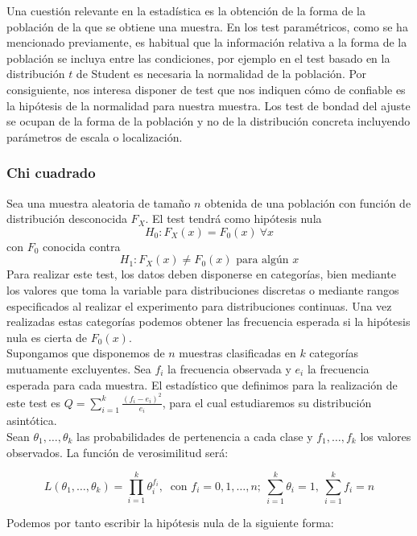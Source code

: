 	Una cuestión relevante en la estadística es la obtención 
de la forma de la población de la que se obtiene una muestra. 
En los test paramétricos, como se ha mencionado previamente, 
es habitual que la información relativa a la forma de la 
población se incluya entre las condiciones, por ejemplo en el 
test basado en la distribución $t$ de Student es necesaria la 
normalidad de la población. Por consiguiente, nos interesa 
disponer de test que nos indiquen cómo de confiable es la 
hipótesis de la normalidad para nuestra muestra. Los test de 
bondad del ajuste se ocupan de la forma de la población y no 
de la distribución concreta incluyendo parámetros de escala o 
localización.
	
\subsubsection{Chi cuadrado}

	Sea una muestra aleatoria de tamaño $n$ obtenida de una 
población con función de distribución desconocida $F_X$. El 
test tendrá como hipótesis nula
		\[ H_0: F_X(x) = F_0(x) \ \forall x \]
	con $F_0$ conocida contra
		\[ H_1: F_X(x) \neq F_0(x) \text{ para algún }  x \]
	Para realizar este test, los datos deben disponerse en
categorías, bien mediante los valores que toma la variable 
para distribuciones discretas o mediante rangos especificados 
al realizar el experimento para distribuciones continuas. Una 
vez realizadas estas categorías podemos obtener las 
frecuencia esperada si la hipótesis nula es cierta de 
$F_0(x)$.\\
	
	Supongamos que disponemos de $n$ muestras clasificadas en 
$k$ categorías mutuamente excluyentes. Sea $f_i$ la 
frecuencia observada y $e_i$ la frecuencia esperada para cada 
muestra. El estadístico que definimos para la realización de 
este test es $Q = \sum\limits_{i=1}^k 
\frac{(f_i-e_i)^2}{e_i}$, para el cual estudiaremos su 
distribución asintótica.\\
	
	Sean $\theta_1, \dots, \theta_k$ las probabilidades de 
pertenencia a cada clase y $f_1, \dots, f_k$ los valores 
observados. La función de verosimilitud será:
	
	\[ L(\theta_1, \dots, \theta_k) = 
			\prod\limits_{i=1}^k \theta_i^{f_i},\			
	   \text{ con } f_i = 0, 1, \dots, n; \
	   \sum\limits_{i=1}^k \theta_i = 1, \
	   \sum\limits_{i=1}^k f_i = n
	 \]
	 
	Podemos por tanto escribir la hipótesis nula de la 
siguiente forma:
	 
